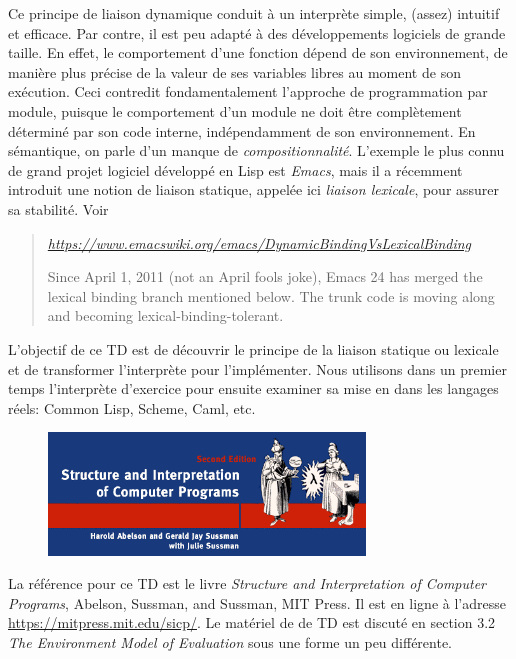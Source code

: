\documentclass{../../LaTeX/tdsimple}
\begin{document}
Ce principe de liaison dynamique conduit à un interprète simple,
(assez) intuitif et efficace. Par contre, il est peu adapté à des
développements logiciels de grande taille. En effet, le comportement
d'une fonction dépend de son environnement, de manière plus précise de
la valeur de ses variables libres au moment de son exécution. Ceci
contredit fondamentalement l'approche de programmation par module,
puisque le comportement d'un module ne doit être complètement
déterminé par son code interne, indépendamment de son
environnement. En sémantique, on parle d'un manque de
\emph{compositionnalité}. L'exemple le plus connu de grand projet
logiciel développé en Lisp est \emph{Emacs}, mais il a récemment
introduit une notion de liaison statique, appelée ici \emph{liaison
  lexicale}, pour assurer sa stabilité. Voir
\begin{quotation} \sl
  \url{https://www.emacswiki.org/emacs/DynamicBindingVsLexicalBinding}

  Since April 1, 2011 (not an April fools joke), Emacs 24 has merged
  the lexical binding branch mentioned below. The trunk code is moving
  along and becoming lexical-binding-tolerant.
\end{quotation}

L'objectif de ce TD est de découvrir le principe de la liaison
statique ou lexicale et de transformer l'interprète pour
l'implémenter. Nous utilisons dans un premier temps l'interprète
d'exercice pour ensuite examiner sa mise en \oeuvre dans les langages
réels: Common Lisp, Scheme, Caml, etc.

\begin{figure}
  \begin{center}
    \includegraphics[width=0.75\textwidth]{SCIP.png}
  \end{center}
\end{figure}

La référence pour ce TD est le livre \emph{Structure and
  Interpretation of Computer Programs}, Abelson, Sussman, and Sussman,
MIT Press. Il est en ligne à l'adresse
\url{https://mitpress.mit.edu/sicp/}. Le matériel de de TD est discuté
en section 3.2 \emph{The Environment Model of Evaluation} sous une
forme un peu différente.
\end{document}

